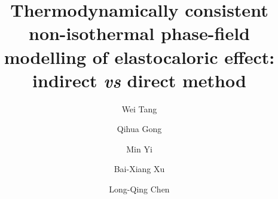 \documentclass[reprint,3p,sort&compress,times,onecolumn]{elsarticle}
\begin{document}

\begin{frontmatter}

\title{Thermodynamically consistent non-isothermal phase-field modelling of elastocaloric effect: indirect \textit{vs} direct method}

\author[rvt]{Wei Tang}

\author[rvt,rvg]{Qihua Gong}

\author[rvt]{Min Yi}


\author[els]{Bai-Xiang Xu}

\author[dres]{Long-Qing Chen}



\address[rvt]{State Key Laboratory of Mechanics and Control 
for Aerospace Structures \& Key Laboratory for Intelligent Nano Materials and Devices of Ministry of Education \& Institute for Frontier Science \& College of Aerospace Engineering, Nanjing University of Aeronautics and Astronautics (NUAA), Nanjing 210016, China}

\address[rvg]{MIIT Key Lab of Aerospace Information Materials and Physics \& College of Physics, Nanjing University of Aeronautics and Astronautics (NUAA), Nanjing
211106, China}

\address[els]{Mechanics of Functional Materials Division, Institute of Materials Science, Technische Universit$\ddot{a}$t Darmstadt, Darmstadt 64287, Germany}

\address[dres]{Department of Materials Science and Engineering and Materials Research Institute, The Pennsylvania State University, PA 16803, USA}


\end{frontmatter}
\end{document}
